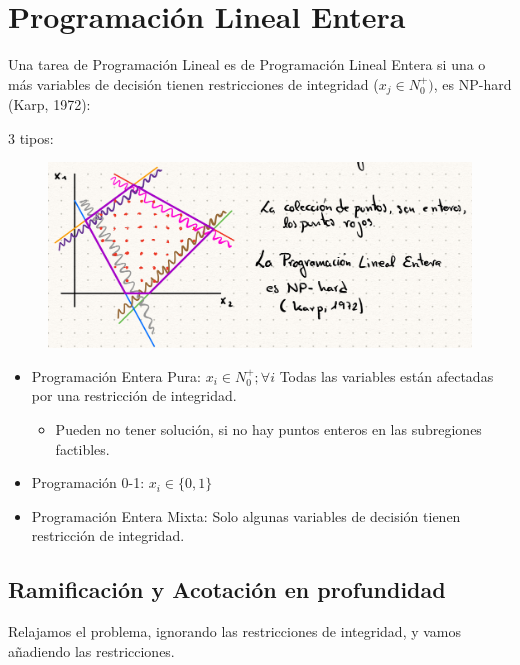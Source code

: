 \documentclass[12pt, twoside, openright]{report} %
\begin{document}
  

\section{Programación Lineal Entera}

  Una tarea de Programación Lineal es de Programación Lineal Entera si
  una o más variables de decisión tienen restricciones de integridad
  (\(x_j \in N^+_0)\), es NP-hard (Karp, 1972):


  3 tipos:
  \begin{figure}[H]
	{\includegraphics[scale=.3]{Untitled 18.png}}
\end{figure}
  \begin{itemize}
	\item Programación Entera Pura: \(x_i \in N^+_0; \forall i\) Todas las
    variables están afectadas por una restricción de integridad. 
	\begin{itemize}
		\item Pueden no tener solución, si no hay puntos enteros en las
		subregiones factibles.
	\end{itemize}
    
	\item
		Programación 0-1: \(x_i \in \{ 0, 1\}\)
  
	\item
      Programación Entera Mixta: Solo algunas variables de decisión
      tienen restricción de integridad.
  \end{itemize}
\pagebreak
  \subsection{Ramificación y Acotación en profundidad}

  Relajamos el problema, ignorando las restricciones de integridad, y
  vamos añadiendo las restricciones.
\end{document}
